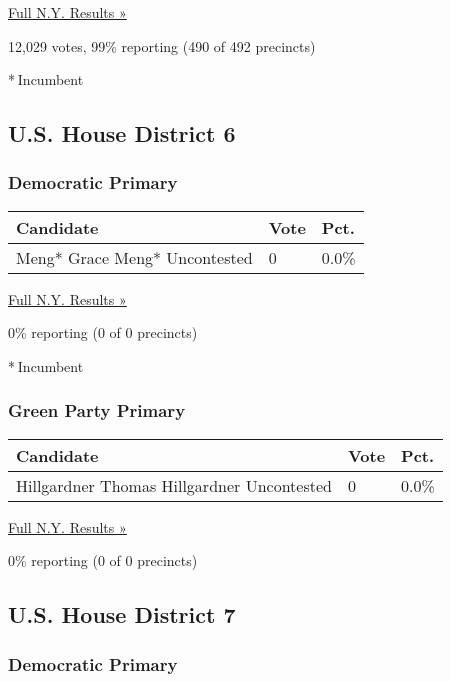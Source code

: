 \href{https://www.nytimes3xbfgragh.onion/elections/results/new-york}{Full
N.Y. Results »}

12,029 votes, 99\% reporting (490 of 492 precincts)

* Incumbent

\hypertarget{us-house-district-6}{%
\subsection{U.S. House District 6}\label{us-house-district-6}}

\hypertarget{democratic-primary-6}{%
\subsubsection{Democratic Primary}\label{democratic-primary-6}}

\begin{longtable}[]{@{}lll@{}}
\toprule
Candidate & Vote & Pct.\tabularnewline
\midrule
\endhead
 Meng* Grace Meng* Uncontested & 0 & 0.0\%\tabularnewline
\bottomrule
\end{longtable}

\href{https://www.nytimes3xbfgragh.onion/elections/results/new-york}{Full
N.Y. Results »}

0\% reporting (0 of 0 precincts)

* Incumbent

\hypertarget{green-party-primary}{%
\subsubsection{Green Party Primary}\label{green-party-primary}}

\begin{longtable}[]{@{}lll@{}}
\toprule
Candidate & Vote & Pct.\tabularnewline
\midrule
\endhead
 Hillgardner Thomas Hillgardner Uncontested & 0 & 0.0\%\tabularnewline
\bottomrule
\end{longtable}

\href{https://www.nytimes3xbfgragh.onion/elections/results/new-york}{Full
N.Y. Results »}

0\% reporting (0 of 0 precincts)

\hypertarget{us-house-district-7}{%
\subsection{U.S. House District 7}\label{us-house-district-7}}

\hypertarget{democratic-primary-7}{%
\subsubsection{Democratic Primary}\label{democratic-primary-7}}

